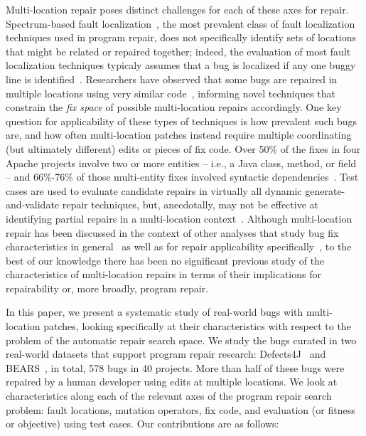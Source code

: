 \documentclass[sigconf, timestamp-false, anonymous=true]{acmart}
\begin{document}
Multi-location repair poses distinct challenges for each of these axes for repair.
Spectrum-based fault localization~\cite{ochiai}, the most prevalent class of
fault localization techniques used in program repair, does not specifically
identify sets of locations that might be related or repaired together; indeed,
the evaluation of most fault localization techniques typicaly assumes that a bug
is localized if any one buggy line is identified~\cite{fl-survey-wong}.
Researchers have observed that some bugs are
repaired in multiple locations using very similar
code~\cite{saha2019harnessing,jiang2019cmsuggester}, informing novel techniques
that constrain the \emph{fix space} of possible multi-location repairs accordingly.
One key question for applicability of these types of techniques is how prevalent
such bugs are, and how often multi-location patches instead require multiple
coordinating (but ultimately different) edits or pieces of fix code.  Over 50\% of the fixes in four 
Apache projects involve two or more entities -- i.e., a Java class, method, or field -- and 66\%-76\% of 
those multi-entity fixes involved syntactic dependencies~\cite{wang2018}. 
Test cases are used to evaluate candidate repairs in virtually all dynamic
generate-and-validate repair techniques, but, anecdotally, may not be effective
at identifying partial repairs in a multi-location
context~\cite{fitness10,maybeeric}.  
Although multi-location repair has been discussed in the context of other analyses
that study bug fix characteristics in general~\cite{examples} as well as for
repair applicability specifically~\cite{moar,examples}, to the best of our
knowledge there has been no significant previous study of the characteristics of
multi-location repairs in terms of their implications for repairability or, more
broadly, program repair.  

In this paper, we present a systematic study of real-world bugs with
multi-location patches,
looking specifically at their characteristics with respect to the problem of the
automatic repair search space.  
We study the bugs curated in two
real-world datasets that support program repair research: Defects4J~\cite{defects4j}
and BEARS~\cite{bears}, in total, 578 bugs in 40 projects. 
More than half of these bugs were repaired by a
human developer using edits at multiple locations.  We look at characteristics along each of the
relevant axes of the program repair search problem: fault locations, mutation
operators, fix code, and evaluation (or fitness or objective) using test cases.  Our 
contributions are
as follows:
\end{document}
